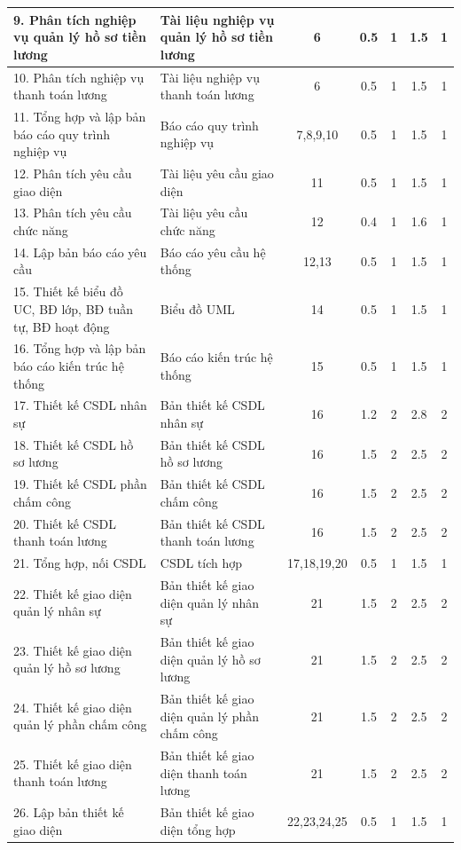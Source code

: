\begin{longtable}{|p{5cm}|p{5cm}|c|c|c|c|c|}
    9. Phân tích nghiệp vụ quản lý hồ sơ tiền lương & Tài liệu nghiệp vụ quản lý hồ sơ tiền lương & 6 & 0.5 & 1 & 1.5 & 1 \\ \hline
    10. Phân tích nghiệp vụ thanh toán lương & Tài liệu nghiệp vụ thanh toán lương & 6 & 0.5 & 1 & 1.5 & 1 \\ \hline
    11. Tổng hợp và lập bản báo cáo quy trình nghiệp vụ & Báo cáo quy trình nghiệp vụ & 7,8,9,10 & 0.5 & 1 & 1.5 & 1 \\ \hline
    12. Phân tích yêu cầu giao diện & Tài liệu yêu cầu giao diện & 11 & 0.5 & 1 & 1.5 & 1 \\ \hline
    13. Phân tích yêu cầu chức năng & Tài liệu yêu cầu chức năng & 12 & 0.4 & 1 & 1.6 & 1 \\ \hline
    14. Lập bản báo cáo yêu cầu & Báo cáo yêu cầu hệ thống & 12,13 & 0.5 & 1 & 1.5 & 1 \\ \hline
    15. Thiết kế biểu đồ UC, BĐ lớp, BĐ tuần tự, BĐ hoạt động & Biểu đồ UML & 14 & 0.5 & 1 & 1.5 & 1 \\ \hline
    16. Tổng hợp và lập bản báo cáo kiến trúc hệ thống & Báo cáo kiến trúc hệ thống & 15 & 0.5 & 1 & 1.5 & 1 \\ \hline
    17. Thiết kế CSDL nhân sự & Bản thiết kế CSDL nhân sự & 16 & 1.2 & 2 & 2.8 & 2 \\ \hline
    18. Thiết kế CSDL hồ sơ lương & Bản thiết kế CSDL hồ sơ lương & 16 & 1.5 & 2 & 2.5 & 2 \\ \hline
    19. Thiết kế CSDL phần chấm công & Bản thiết kế CSDL chấm công & 16 & 1.5 & 2 & 2.5 & 2 \\ \hline
    20. Thiết kế CSDL thanh toán lương & Bản thiết kế CSDL thanh toán lương & 16 & 1.5 & 2 & 2.5 & 2 \\ \hline
    21. Tổng hợp, nối CSDL & CSDL tích hợp & 17,18,19,20 & 0.5 & 1 & 1.5 & 1 \\ \hline
    22. Thiết kế giao diện quản lý nhân sự & Bản thiết kế giao diện quản lý nhân sự & 21 & 1.5 & 2 & 2.5 & 2 \\ \hline
    23. Thiết kế giao diện quản lý hồ sơ lương & Bản thiết kế giao diện quản lý hồ sơ lương & 21 & 1.5 & 2 & 2.5 & 2 \\ \hline
    24. Thiết kế giao diện quản lý phần chấm công & Bản thiết kế giao diện quản lý phần chấm công & 21 & 1.5 & 2 & 2.5 & 2 \\ \hline
    25. Thiết kế giao diện thanh toán lương & Bản thiết kế giao diện thanh toán lương & 21 & 1.5 & 2 & 2.5 & 2 \\ \hline
    26. Lập bản thiết kế giao diện & Bản thiết kế giao diện tổng hợp & 22,23,24,25 & 0.5 & 1 & 1.5 & 1 \\ \hline

\end{longtable}

